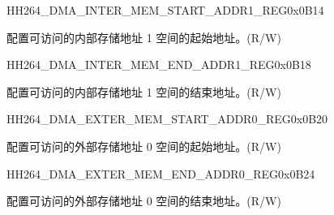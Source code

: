 \begin{register}{H}{H264\_DMA\_INTER\_MEM\_START\_ADDR1\_REG}{0x0B14}\label{regdesc:H264DMAINTERMEMSTARTADDR1REG}
%
\regnewline%
\begin{regdesc}\begin{reglist}
\label{fielddesc:H264DMAACCESSINTERMEMSTARTADDR1}\item [H264\_DMA\_ACCESS\_INTER\_MEM\_START\_ADDR1] 配置可访问的内部存储地址 1 空间的起始地址。(R/W)
\end{reglist}\end{regdesc}
\end{register}


\begin{register}{H}{H264\_DMA\_INTER\_MEM\_END\_ADDR1\_REG}{0x0B18}\label{regdesc:H264DMAINTERMEMENDADDR1REG}
%
\regnewline%
\begin{regdesc}\begin{reglist}
\label{fielddesc:H264DMAACCESSINTERMEMENDADDR1}\item [H264\_DMA\_ACCESS\_INTER\_MEM\_END\_ADDR1] 配置可访问的内部存储地址 1 空间的结束地址。(R/W)
\end{reglist}\end{regdesc}
\end{register}


\begin{register}{H}{H264\_DMA\_EXTER\_MEM\_START\_ADDR0\_REG}{0x0B20}\label{regdesc:H264DMAEXTERMEMSTARTADDR0REG}
%
\regnewline%
\begin{regdesc}\begin{reglist}
\label{fielddesc:H264DMAACCESSEXTERMEMSTARTADDR0}\item [H264\_DMA\_ACCESS\_EXTER\_MEM\_START\_ADDR0] 配置可访问的外部存储地址 0 空间的起始地址。(R/W)
\end{reglist}\end{regdesc}
\end{register}


\begin{register}{H}{H264\_DMA\_EXTER\_MEM\_END\_ADDR0\_REG}{0x0B24}\label{regdesc:H264DMAEXTERMEMENDADDR0REG}
%
\regnewline%
\begin{regdesc}\begin{reglist}
\label{fielddesc:H264DMAACCESSEXTERMEMENDADDR0}\item [H264\_DMA\_ACCESS\_EXTER\_MEM\_END\_ADDR0] 配置可访问的外部存储地址 0 空间的结束地址。(R/W)
\end{reglist}\end{regdesc}
\end{register}


